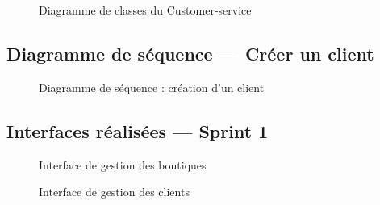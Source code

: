 \begin{figure}[H]
    \centering
    \caption{Diagramme de classes du Customer-service}
    \label{fig:class_customer}
\end{figure}

\subsection{Diagramme de séquence --- Créer un client}

\begin{figure}[H]
    \centering
    \caption{Diagramme de séquence : création d'un client}
    \label{fig:seq_create_customer}
\end{figure}

\subsection{Interfaces réalisées --- Sprint 1}
\begin{figure}[H]
    \centering
    \caption{Interface de gestion des boutiques}
    \label{fig:ui_boutiques}
\end{figure}

\begin{figure}[H]
    \centering
    \caption{Interface de gestion des clients}
    \label{fig:ui_clients}
\end{figure}

